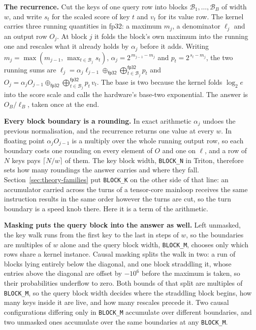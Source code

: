 \documentclass[sigplan,nonacm]{acmart}
\newcommand{\dt}[1]{\mathsf{#1}}
\newcommand{\fpadd}[1]{\mathbin{\oplus_{\dt{#1}}}}
\newcommand{\fpsum}[1]{\bigoplus\nolimits^{\dt{#1}}}
\begin{document}
\textbf{The recurrence.} Cut the keys of one query row into blocks
$\mathcal{B}_1,\dots,\mathcal{B}_B$ of width $w$, and write $s_t$ for the scaled
score of key $t$ and $v_t$ for its value row. The kernel carries three running
quantities in fp32: a maximum $m_j$, a denominator $\ell_j$ and an output row
$O_j$. At block $j$ it folds the block's own maximum into the running one and
rescales what it already holds by $\alpha_j$ before it adds. Writing
$m_j = \max(m_{j-1},\, \max_{t \in \mathcal{B}_j} s_t)$,
$\alpha_j = 2^{\,m_{j-1} - m_j}$ and $p_t = 2^{\,s_t - m_j}$, the two running
sums are $\ell_{j} = \alpha_j \ell_{j-1} \fpadd{fp32} \fpsum{fp32}_{t \in
\mathcal{B}_j} p_t$ and $O_{j} = \alpha_j O_{j-1} \fpadd{fp32}
\fpsum{fp32}_{t \in \mathcal{B}_j} p_t\, v_t$.
The base is two because the kernel folds $\log_2 e$ into the score scale and
calls the hardware's base-two exponential. The answer is $O_B / \ell_B$, taken
once at the end.

\textbf{Every block boundary is a rounding.} In exact arithmetic $\alpha_j$
undoes the previous normalisation, and the recurrence returns one value at every
$w$. In floating point $\alpha_j O_{j-1}$ is a multiply over the whole running
output row, so each boundary costs one rounding on every element of $O$ and one
on $\ell$, and a row of $N$ keys pays $\lceil N / w \rceil$ of them. The key
block width, \texttt{BLOCK\_N} in Triton, therefore sets how many roundings the
answer carries and where they fall.
Section~\ref{sec:theory-families} put \texttt{BLOCK\_K} on the other side of that
line: an accumulator carried across the turns of a tensor-core mainloop receives
the same instruction results in the same order however the turns are cut, so the
turn boundary is a speed knob there. Here it is a term of the arithmetic.

\textbf{Masking puts the query block into the answer as well.} Left unmasked,
the key walk runs from the first key to the last in steps of $w$, so the
boundaries are multiples of $w$ alone and the query block width,
\texttt{BLOCK\_M}, chooses only which rows share a kernel instance. Causal
masking splits the walk in two: a run of blocks lying entirely below the
diagonal, and one block straddling it, whose entries above the diagonal are
offset by $-10^{6}$ before the maximum is taken, so their probabilities
underflow to zero. Both bounds of that split are multiples of \texttt{BLOCK\_M},
so the query block width decides where the straddling block begins, how many
keys inside it are live, and how many rescales precede it. Two causal
configurations differing only in
\texttt{BLOCK\_M} accumulate over different boundaries, and two unmasked ones
accumulate over the same boundaries at any \texttt{BLOCK\_M}.
\end{document}
